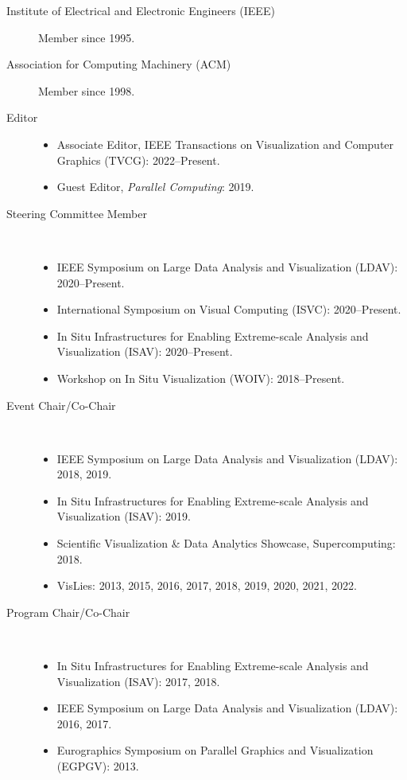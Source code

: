 \documentclass{article}
\begin{document}
\begin{description}
\item[Institute of Electrical and Electronic Engineers (IEEE)]
  Member since 1995.
\item[Association for Computing Machinery (ACM)]  Member since 1998.
\item[Editor]
  \begin{itemize}
  \item
    Associate Editor, IEEE Transactions on Visualization and Computer Graphics (TVCG): 2022--Present.
  \item
    Guest Editor, \emph{Parallel Computing}: 2019.
  \end{itemize}
\item[Steering Committee Member]~
  \begin{itemize}
  \item
    IEEE Symposium on Large Data Analysis and Visualization (LDAV): 2020--Present.
  \item
    International Symposium on Visual Computing (ISVC): 2020--Present.
  \item
    In Situ Infrastructures for Enabling Extreme-scale Analysis and Visualization (ISAV): 2020--Present.
  \item
    Workshop on In Situ Visualization (WOIV): 2018--Present.
  \end{itemize}
\item[Event Chair/Co-Chair]~
  \begin{itemize}
  \item
    IEEE Symposium on Large Data Analysis and Visualization (LDAV): 2018, 2019.
  \item
    In Situ Infrastructures for Enabling Extreme-scale Analysis and Visualization (ISAV): 2019.
  \item
    Scientific Visualization \& Data Analytics Showcase, Supercomputing: 2018.
  \item
    VisLies: 2013, 2015, 2016, 2017, 2018, 2019, 2020, 2021, 2022.
  \end{itemize}
\item[Program Chair/Co-Chair]~
  \begin{itemize}
  \item
    In Situ Infrastructures for Enabling Extreme-scale Analysis and Visualization (ISAV): 2017, 2018.
  \item
    IEEE Symposium on Large Data Analysis and Visualization (LDAV): 2016, 2017.
  \item
    Eurographics Symposium on Parallel Graphics and Visualization (EGPGV): 2013.

\end{itemize}
\end{description}
\end{document}
